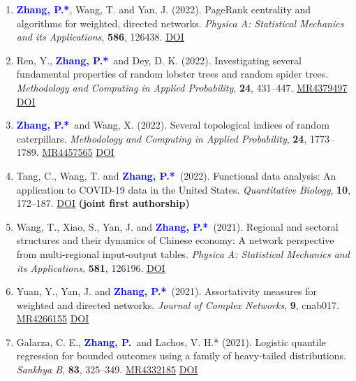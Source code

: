 \documentclass{res}
\def\MR#1{\href{http://www.ams.org/mathscinet-getitem?mr=#1}{MR#1}}
\newcommand{\PZ}{\textbf{\textcolor{blue}{Zhang, P.*}}}
\newcommand{\PZnot}{\textbf{\textcolor{blue}{Zhang, P.}}}
\begin{document}
\begin{resume}
\begin{enumerate}
	\item \PZ, {\sc Wang, T.} and {\sc Yan, J.} (2022). PageRank 
	centrality and algorithms for weighted, directed networks. {\em 
	Physica A: Statistical Mechanics and its Applications}, {\bf 
	586}, 126438. 
	\href{https://doi.org/10.1016/j.physa.2021.126438}
	{\underline{DOI}}
	
	\item {\sc Ren, Y.}, \PZ\ and {\sc Dey, D. K.} (2022). 
	Investigating several fundamental properties of random 
	lobster trees and random spider trees. {\em Methodology and 
		Computing in Applied Probability}, {\bf 24}, 431--447. 
	\MR{4379497} \href{https://doi.org/10.1007/s11009-021-09863-9}
	{\underline{DOI}}
	
	\item \PZ\ and {\sc Wang, X.} (2022). Several 
	topological indices of random caterpillars. 
	{\em Methodology and Computing in Applied Probability}, {\bf 
	24}, 1773--1789. \MR{4457565} 
	\href{https://doi.org/10.1007/s11009-021-09895-1}
	{\underline{DOI}} 
	
	\item {\sc Tang, C., Wang, T.} and \PZ\ (2022). 
	Functional data analysis: An application to COVID-19 data in
	the United States. {\em Quantitative Biology}, {\bf 10}, 
	172--187.
	\href{https://doi.org/10.15302/J-QB-022-0300}
	{\underline{DOI}} {\bf \small (joint first authorship)}
	
	\item {\sc Wang, T., Xiao, S., Yan, J.} and \PZ\ 
	(2021). Regional and sectoral structures and their dynamics of
	Chinese economy: A network perspective from
	multi-regional input-output tables. {\em Physica A: Statistical 
	Mechanics and its Applications}, {\bf 581}, 126196.
	\href{https://doi.org/10.1016/j.physa.2021.126196}
	{\underline{DOI}}
	
	\item {\sc Yuan, Y., Yan, J.} and \PZ\ (2021). 
	Assortativity measures for weighted and directed
	networks. \emph{Journal of Complex Networks}, {\bf 9}, cnab017. 
	\MR{4266155} \href{https://doi.org/10.1093/comnet/cnab017}
	{\underline{DOI}}
	
	\item {\sc Galarza, C. E.}, \PZnot\	and {\sc Lachos, V. H.*} 
	(2021). Logistic quantile regression for bounded outcomes using 
	a family of heavy-tailed distributions. {\em Sankhya B}, {\bf 
	83}, 325--349. \MR{4332185} 
	\href{https://doi.org/10.1007/s13571-020-00231-0}
	{\underline{DOI}}
	

\end{enumerate}
\end{resume}
\end{document}
